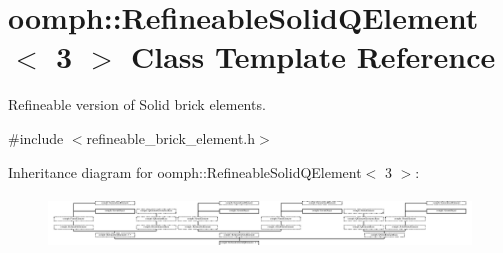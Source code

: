 \hypertarget{classoomph_1_1RefineableSolidQElement_3_013_01_4}{}\section{oomph\+:\+:Refineable\+Solid\+Q\+Element$<$ 3 $>$ Class Template Reference}
\label{classoomph_1_1RefineableSolidQElement_3_013_01_4}


Refineable version of Solid brick elements.  




{\ttfamily \#include $<$refineable\+\_\+brick\+\_\+element.\+h$>$}

Inheritance diagram for oomph\+:\+:Refineable\+Solid\+Q\+Element$<$ 3 $>$\+:\begin{figure}[H]
\begin{center}
\leavevmode
\includegraphics[height=1.423729cm]{classoomph_1_1RefineableSolidQElement_3_013_01_4}
\end{center}
\end{figure}
